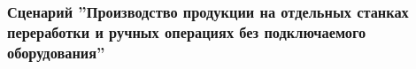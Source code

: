 \begin{comment}
\item После этого вносить изменения в документ сможет только пользователь, обладающий соответствующими правами. Установка данного признака позволяет обезопасить документ в системе \gofro от последующих несанкционированных изменений пользователями.

\item Ответственным за верное заполнение отчётов по выработке является \master.


\end{enumerate}



\end{comment}





\subsubsection{Сценарий ''Производство продукции на отдельных станках переработки и ручных операциях без подключаемого оборудования''}
\label{bp:production_21}

